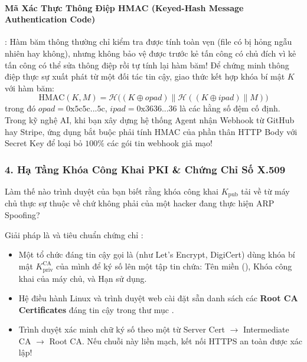 \paragraph{Mã Xác Thực Thông Điệp HMAC (Keyed-Hash Message Authentication Code)}:
Hàm băm thông thường chỉ kiểm tra được tính toàn vẹn (file có bị hỏng ngẫu nhiên hay không), nhưng không bảo vệ được trước kẻ tấn công có chủ đích vì kẻ tấn công có thể sửa thông điệp rồi tự tính lại hàm băm! Để chứng minh thông điệp thực sự xuất phát từ một đối tác tin cậy, giao thức  kết hợp khóa bí mật $K$ với hàm băm:
\begin{equation}
\text{HMAC}(K, M) = \mathcal{H}\Big((K \oplus opad) \parallel \mathcal{H}((K \oplus ipad) \parallel M)\Big)
\label{eq:hmac-formula}
\end{equation}
trong đó $opad = \text{0x5c5c...5c}$, $ipad = \text{0x3636...36}$ là các hằng số đệm cố định.
Trong kỹ nghệ AI, khi bạn xây dựng hệ thống Agent nhận Webhook từ GitHub hay Stripe, ứng dụng bắt buộc phải tính HMAC của phần thân HTTP Body với Secret Key để loại bỏ $100\%$ các gói tin webhook giả mạo!

\subsubsection{4. Hạ Tầng Khóa Công Khai PKI \& Chứng Chỉ Số X.509}
Làm thế nào trình duyệt của bạn biết rằng khóa công khai $K_{\text{pub}}$ tải về từ máy chủ thực sự thuộc về  chứ không phải của một hacker đang thực hiện ARP Spoofing?

Giải pháp là  và tiêu chuẩn chứng chỉ :
\begin{itemize}
  \item Một tổ chức đáng tin cậy gọi là  (như Let's Encrypt, DigiCert) dùng khóa bí mật $K_{\text{priv}}^{\text{CA}}$ của mình để ký số lên một tập tin chứa: Tên miền (), Khóa công khai của máy chủ, và Hạn sử dụng.
  \item Hệ điều hành Linux và trình duyệt web cài đặt sẵn danh sách các \textbf{Root CA Certificates} đáng tin cậy trong thư mục .
  \item Trình duyệt xác minh chữ ký số theo một  từ Server Cert $\to$ Intermediate CA $\to$ Root CA. Nếu chuỗi này liền mạch, kết nối HTTPS an toàn được xác lập!
\end{itemize}

